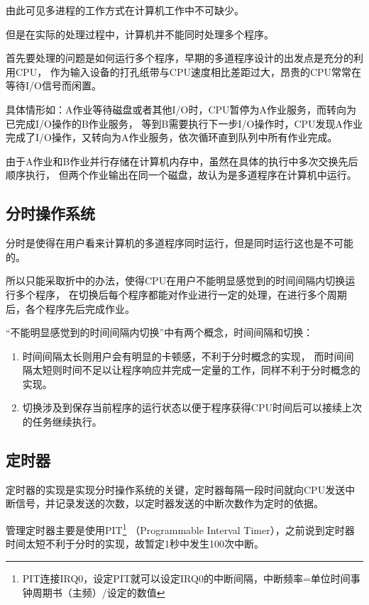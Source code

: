 由此可见多进程的工作方式在计算机工作中不可缺少。

但是在实际的处理过程中，计算机并不能同时处理多个程序。

首先要处理的问题是如何运行多个程序，早期的多道程序设计的出发点是充分的利用CPU，
作为输入设备的打孔纸带与CPU速度相比差距过大，昂贵的CPU常常在等待I/O信号而闲置。

具体情形如：A作业等待磁盘或者其他I/O时，CPU暂停为A作业服务，而转向为已完成I/O操作的B作业服务，
等到B需要执行下一步I/O操作时，CPU发现A作业完成了I/O操作，又转向为A作业服务，依次循环直到队列中所有作业完成。

由于A作业和B作业并行存储在计算机内存中，虽然在具体的执行中多次交换先后顺序执行，
但两个作业输出在同一个磁盘，故认为是多道程序在计算机中运行。

\subsection{分时操作系统}

分时是使得在用户看来计算机的多道程序同时运行，但是同时运行这也是不可能的。

所以只能采取折中的办法，使得CPU在用户不能明显感觉到的时间间隔内切换运行多个程序，
在切换后每个程序都能对作业进行一定的处理，在进行多个周期后，各个程序先后完成作业。

“不能明显感觉到的时间间隔内切换”中有两个概念，时间间隔和切换：

\begin{enumerate}
\item 时间间隔太长则用户会有明显的卡顿感，不利于分时概念的实现，
  而时间间隔太短则时间不足以让程序响应并完成一定量的工作，同样不利于分时概念的实现。
\item 切换涉及到保存当前程序的运行状态以便于程序获得CPU时间后可以接续上次的任务继续执行。
\end{enumerate}

\subsection{定时器}

定时器的实现是实现分时操作系统的关键，定时器每隔一段时间就向CPU发送中断信号，并记录发送的次数，以定时器发送的中断次数作为定时的依据。

管理定时器主要是使用PIT\footnote{PIT连接IRQ0，设定PIT就可以设定IRQ0的中断间隔，中断频率=单位时间事钟周期书（主频）/设定的数值}
（Programmable Interval Timer），之前说到定时器时间太短不利于分时的实现，故暂定1秒中发生100次中断。

